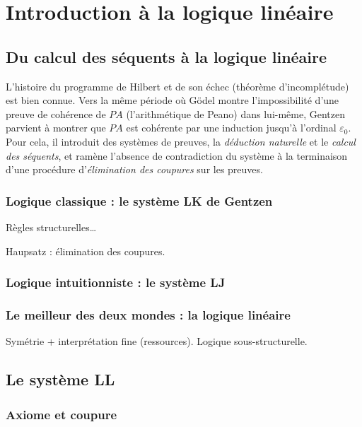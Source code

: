 \documentclass[a4paper, 11pt]{article}
\begin{document}
\newpage

\tableofcontents

\newpage

\section{Introduction à la logique linéaire}

\subsection{Du calcul des séquents à la logique linéaire}

L'histoire du programme de Hilbert et de son échec (théorème d'incomplétude) est bien connue. Vers la même période où Gödel montre l'impossibilité d'une preuve de cohérence de $PA$ (l'arithmétique de Peano) dans lui-même, Gentzen parvient à montrer que $PA$ est cohérente par une induction jusqu'à l'ordinal $\varepsilon_0$. Pour cela, il introduit des systèmes de preuves, la \emph{déduction naturelle} et le \emph{calcul des séquents}, et ramène l'absence de contradiction du système à la terminaison d'une procédure d'\emph{élimination des coupures} sur les preuves.

\subsubsection{Logique classique : le système LK de Gentzen}

Règles structurelles\ldots

Haupsatz : élimination des coupures.

\subsubsection{Logique intuitionniste : le système LJ}

\subsubsection{Le meilleur des deux mondes : la logique linéaire}

Symétrie + interprétation fine (ressources).
Logique sous-structurelle.

\subsection{Le système LL}

\subsubsection{Axiome et coupure}
\end{document}
